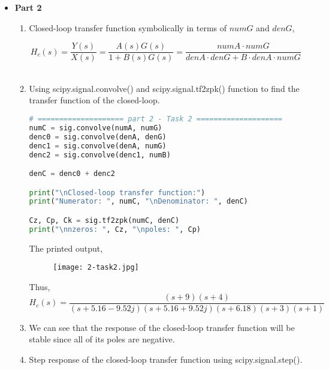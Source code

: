 \documentclass[12pt,a4paper]{article}
\begin{document}
\begin{itemize}
\item \textbf{Part 2}\\

\begin{enumerate}

    \item
    Closed-loop transfer function symbolically in terms of $numG$ and $denG$,
    
    $$H_{c}(s) = \frac{Y(s)}{X(s)} = \frac{A(s)G(s)}{1+B(s)G(s)} = \frac{numA \cdot numG}{denA \cdot denG + B \cdot denA \cdot numG}$$\\
    
    \item 
    Using scipy.signal.convolve() and scipy.signal.tf2zpk() function to find the transfer function of the closed-loop.\\

\begin{lstlisting}[language=Python, caption={closed-loop transfer function}, label={lst:code}, mathescape=true, breaklines=true]
# ==================== part 2 - Task 2 ====================
numC = sig.convolve(numA, numG)
denc0 = sig.convolve(denA, denG)
denc1 = sig.convolve(denA, numG)
denc2 = sig.convolve(denc1, numB)

denC = denc0 + denc2

print("\nClosed-loop transfer function:")
print("Numerator: ", numC, "\nDenominator: ", denC)

Cz, Cp, Ck = sig.tf2zpk(numC, denC)
print("\nnzeros: ", Cz, "\npoles: ", Cp)
\end{lstlisting}

The printed output,
\begin{figure}[h]
    \centering
    \texttt{[image: 2-task2.jpg]}
\end{figure}\textbf{}

Thus,
    $$H_{c}(s) = \frac{(s+9)(s+4)}{(s+5.16-9.52j)(s+5.16+9.52j)(s+6.18)(s+3)(s+1)}$$
\newline

    \item 
    We can see that the response of the closed-loop transfer function will be stable since all of its poles are negative.\\
    
    \item Step response of the closed-loop transfer function using scipy.signal.step().\\
    

\end{enumerate}
\end{itemize}
\end{document}
